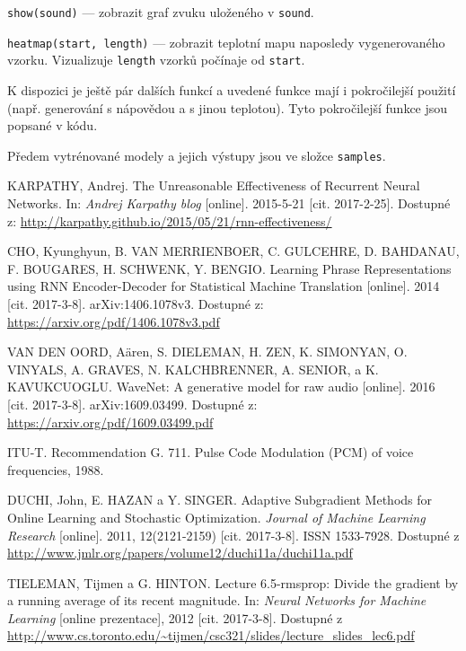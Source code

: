 \documentclass[a4]{article}
\begin{document}
\verb|show(sound)| --- zobrazit graf zvuku uloženého v \verb|sound|.

\verb|heatmap(start, length)| --- zobrazit teplotní mapu naposledy vygenerovaného vzorku. Vizualizuje \verb|length| vzorků počínaje od \verb|start|.

K dispozici je ještě pár dalších funkcí a uvedené funkce mají i pokročilejší použití (např. generování s nápovědou a s jinou teplotou). Tyto pokročilejší funkce jsou popsané v kódu.

Předem vytrénované modely a jejich výstupy jsou ve složce \verb|samples|.

\begin{thebibliography}{9}

KARPATHY, Andrej.
The Unreasonable Effectiveness of Recurrent Neural Networks.
In: \textit{Andrej Karpathy blog} [online]. 2015-5-21 [cit. 2017-2-25].
Dostupné z: \url{http://karpathy.github.io/2015/05/21/rnn-effectiveness/}

CHO, Kyunghyun, B. VAN MERRIENBOER, C. GULCEHRE, D. BAHDANAU, F. BOUGARES, H. SCHWENK, Y. BENGIO.
Learning Phrase Representations using RNN Encoder-Decoder for Statistical Machine Translation [online].
2014 [cit. 2017-3-8].
arXiv:1406.1078v3.
Dostupné z: \url{https://arxiv.org/pdf/1406.1078v3.pdf}


VAN DEN OORD, Aären, S. DIELEMAN, H. ZEN, K. SIMONYAN, O. VINYALS, A. GRAVES, N. KALCHBRENNER, A. SENIOR, a K. KAVUKCUOGLU.
WaveNet: A generative model for raw audio [online].
2016 [cit. 2017-3-8].
arXiv:1609.03499.
Dostupné z: \url{https://arxiv.org/pdf/1609.03499.pdf}

ITU-T. Recommendation G. 711. Pulse Code Modulation (PCM) of voice frequencies, 1988.

DUCHI, John, E. HAZAN a Y. SINGER. Adaptive Subgradient Methods for Online Learning and Stochastic Optimization. \textit{Journal of Machine Learning Research} [online]. 2011, 12(2121-2159) [cit. 2017-3-8]. ISSN 1533-7928. Dostupné z \url{http://www.jmlr.org/papers/volume12/duchi11a/duchi11a.pdf}

TIELEMAN, Tijmen a G. HINTON. Lecture 6.5-rmsprop: Divide the gradient by a running average of its recent magnitude. In: \textit{Neural Networks for Machine Learning} [online prezentace], 2012 [cit. 2017-3-8]. Dostupné z \url{http://www.cs.toronto.edu/~tijmen/csc321/slides/lecture_slides_lec6.pdf}





\end{thebibliography}
\end{document}
